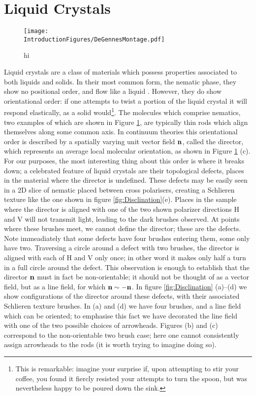 \section{Liquid Crystals}

\begin{figure}[htbp]
\centering
\texttt{[image: \\IntroductionFigures/DeGennesMontage.pdf]}
\caption{hi }
\label{fig:DeGennesMontage}
\end{figure}

Liquid crystals are a class of materials which possess properties associated to both liquids and solids. In their most common form, the nematic phase, they show no positional order, and flow like a liquid \cite{DeGennes}. However, they do show orientational order: if one attempts to twist a portion of the liquid crystal it will respond elastically, as a solid would\footnote{This is remarkable: imagine your surprise if, upon attempting to stir your coffee, you found it fiercly resisted your attempts to turn the spoon, but was nevertheless happy to be poured down the sink.}. The molecules which comprise nematics, two examples of which are shown in Figure \ref{fig:DeGennesMontage}, are typically thin rods which align themselves along some common axis. In continuum theories this orientational order is described by a spatially varying unit vector field $\bf n$, called the director, which represents an average local molecular orientation, as shown in Figure \ref{fig:DeGennesMontage} (c). For our purposes, the most interesting thing about this order is where it breaks down; a celebrated feature of liquid crystals are their topological defects, places in the material where the director is undefined. These defects may be easily seen in a 2D slice of nematic placed between cross polarisers, creating a Schlieren texture \cite{DeGennes} like the one shown in figure \ref{fig:Disclination}(e). Places in the sample where the director is aligned with one of the two shown polarizer directions H and V will not transmit light, leading to the dark brushes observed. At points where these brushes meet, we cannot define the director; these are the defects. Note immeadiately that some defects have four brushes entering them, some only have two. Traversing a circle around a defect with two brushes, the director is aligned with each of H and V only once; in other word it makes only half a turn in a full circle around the defect. This observation is enough to establish that the director $\bf{n}$ must in fact be non-orientable; it should not be thought of as a vector field, but as a line field, for which $\bf n \sim - \bf n$. In figure \ref{fig:Disclination} (a)--(d) we show configurations of the director around these defects, with their associated Schlieren texture brushes. In (a) and (d) we have four brushes, and a line field which can be oriented; to emphasise this fact we have decorated the line field with one of the two possible choices of arrowheads. Figures (b) and (c) correspond to the non-orientable two brush case; here one cannot consistently assign arrowheads to the rods (it is worth trying to imagine doing so). 
